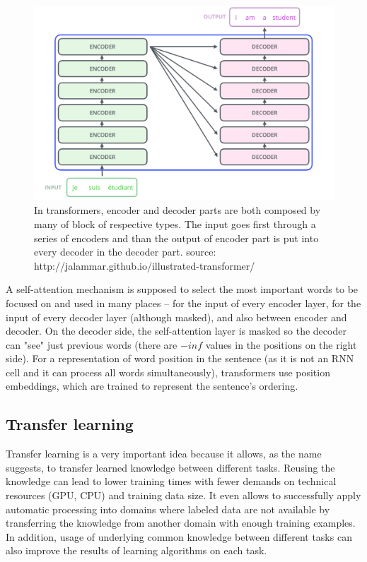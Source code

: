 \begin{figure}[h]
\centering
\includegraphics[width=1\columnwidth]{../img/encoder_decoder_all}
\protect\caption{ In transformers, encoder and decoder parts are both composed by many of block of respective types. The input goes first through a series of encoders and than the output of encoder part is put into every decoder in the decoder part. %
source: http://jalammar.github.io/illustrated-transformer/  }
\label{pic:enco_deco_all}
\end{figure}
A self-attention mechanism is supposed to select the most important words to be focused on and used in many places -- for the input of every encoder layer, for the input of every decoder layer (although masked), and also between encoder and decoder. On the decoder side, the self-attention layer is masked so the decoder can "see" just previous words (there are $-inf$ values in the positions on the right side). For a representation of word position in the sentence (as it is not an RNN cell and it can process all words simultaneously), transformers use position embeddings, which are trained to represent the sentence's ordering.

\subsection{Transfer learning}
\label{sub:models}
Transfer learning is a very important idea because it allows, as the name suggests, to transfer learned knowledge between different tasks. 
Reusing the knowledge can lead to lower training times with fewer demands on technical resources (GPU, CPU) and training data size. It even allows to successfully apply automatic processing into domains where labeled data are not available by transferring the knowledge from another domain with enough training examples. In addition, usage of underlying common knowledge between different tasks can also improve the results of learning algorithms on each task. %

